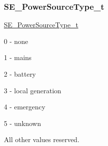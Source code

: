 \subsubsection{\texorpdfstring{S\+E\+\_\+\+Power\+Source\+Type\+\_\+t}{SE\_PowerSourceType\_t}}
{\footnotesize\ttfamily \hyperlink{group__PowerSourceType_ga196e6e180c5421a97062704daa6a96fc}{S\+E\+\_\+\+Power\+Source\+Type\+\_\+t}}

0 -\/ none

1 -\/ mains

2 -\/ battery

3 -\/ local generation

4 -\/ emergency

5 -\/ unknown

All other values reserved. 